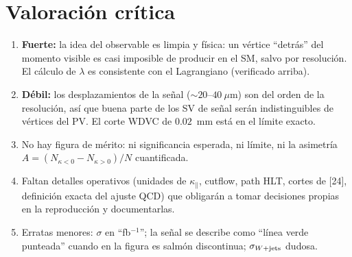 \documentclass[11pt,a4paper]{article}
\newcommand{\kpar}{\kappa_{\parallel}}
\begin{document}
\section{Valoración crítica}
\begin{enumerate}
\item \textbf{Fuerte:} la idea del observable es limpia y física: un vértice ``detrás'' del momento visible es casi imposible de producir en el SM, salvo por resolución. El cálculo de $\lambda$ es consistente con el Lagrangiano (verificado arriba).
\item \textbf{Débil:} los desplazamientos de la señal ($\sim20$--$40~\mu$m) son del orden de la resolución, así que buena parte de los SV de señal serán indistinguibles de vértices del PV. El corte WDVC de $0.02$~mm está en el límite exacto.
\item No hay figura de mérito: ni significancia esperada, ni límite, ni la asimetría $A=(N_{\kappa<0}-N_{\kappa>0})/N$ cuantificada.
\item Faltan detalles operativos (unidades de $\kpar$, cutflow, path HLT, cortes de [24], definición exacta del ajuste QCD) que obligarán a tomar decisiones propias en la reproducción y documentarlas.
\item Erratas menores: $\sigma$ en ``fb$^{-1}$''; la señal se describe como ``línea verde punteada'' cuando en la figura es salmón discontinua; $\sigma_{W+\rm jets}$ dudosa.
\end{enumerate}

\end{document}
